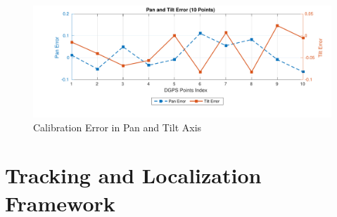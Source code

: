 \documentclass[journal,article,submit,moreauthors,pdftex,10pt,a4paper]{mdpi}
\begin{document}
\begin{figure}[htb]
	\centering
	\includegraphics[width=\textwidth]{Figs/chp03_vision_19_pan_tilt_ten_points_error.pdf}	
	\caption{Calibration Error in Pan and Tilt Axis}
	\label{fig:chp03_vision_19_pan_tilt_ten_points_error}
\end{figure}




\section{Tracking and Localization Framework}
\end{document}
